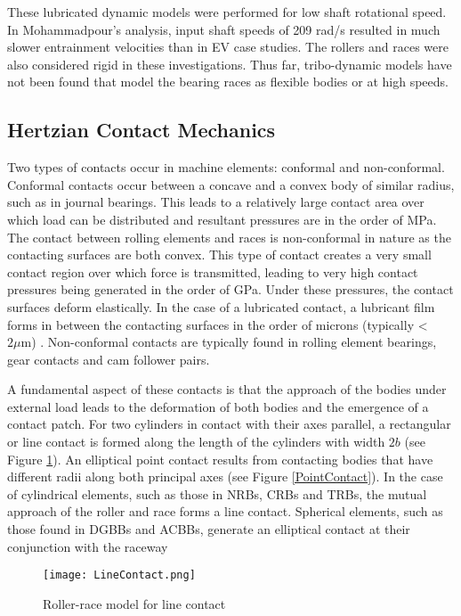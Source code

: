 These lubricated dynamic models were performed for low shaft rotational speed. In Mohammadpour’s analysis, input shaft speeds of 209 rad/s resulted in much slower entrainment velocities than in EV case studies. The rollers and races were also considered rigid in these investigations. Thus far, tribo-dynamic models have not been found that model the bearing races as flexible bodies or at high speeds.

\subsection{Hertzian Contact Mechanics}

Two types of contacts occur in machine elements: conformal and non-conformal. Conformal contacts occur between a concave and a convex body of similar radius, such as in journal bearings. This leads to a relatively large contact area over which load can be distributed and resultant pressures are in the order of MPa. The contact between rolling elements and races is non-conformal in nature as the contacting surfaces are both convex. This type of contact creates a very small contact region over which force is transmitted, leading to very high contact pressures being generated in the order of GPa. Under these pressures, the contact surfaces deform elastically. In the case of a lubricated contact, a lubricant film forms in between the contacting surfaces in the order of microns (typically < $2 \mu \mathrm{m}$) \cite{Gohar2018}. Non-conformal contacts are typically found in rolling element bearings, gear contacts and cam follower pairs.

A fundamental aspect of these contacts is that the approach of the bodies under external load leads to the deformation of both bodies and the emergence of a contact patch. For two cylinders in contact with their axes parallel, a rectangular or line contact is formed along the length of the cylinders with width $2b$ (see Figure \ref{LineContact}). An elliptical point contact results from contacting bodies that have different radii along both principal axes \cite{Johnson1985} (see Figure \ref{PointContact}). In the case of cylindrical elements, such as those in NRBs, CRBs and TRBs, the mutual approach of the roller and race forms a line contact. Spherical elements, such as those found in DGBBs and ACBBs, generate an elliptical contact at their conjunction with the raceway

\begin{figure}
	\centerline{\texttt{[image: LineContact.png]}}
	\caption{Roller-race model for line contact \cite{Zaretsky2016}}
	\label{LineContact}
\end{figure}

